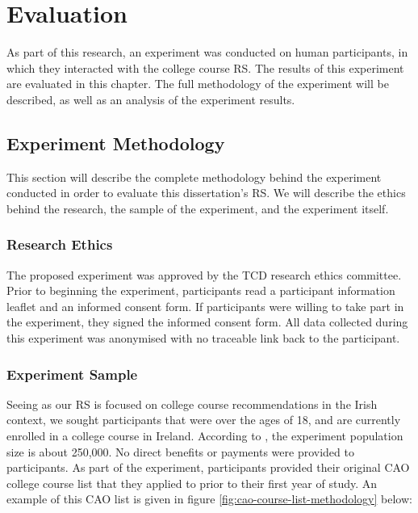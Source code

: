 \chapter{Evaluation}
\label{chap:evaluation}

As part of this research, an experiment was conducted on human participants,
in which they interacted with the college course RS.
The results of this experiment are evaluated in this chapter.
The full methodology of the experiment will be described,
as well as an analysis of the experiment results.

\section{Experiment Methodology}

This section will describe the complete methodology behind the experiment conducted in order to 
evaluate this dissertation's RS.
We will describe the ethics behind the research, the sample of the experiment,
and the experiment itself.

\subsection{Research Ethics}

The proposed experiment was approved by the TCD research ethics committee.
Prior to beginning the experiment, participants read a participant information leaflet
and an informed consent form.
If participants were willing to take part in the experiment, they signed the informed consent form.
All data collected during this experiment was anonymised with no traceable link back to the participant.

\subsection{Experiment Sample}

Seeing as our RS is focused on college course recommendations in the Irish context,
we sought participants that were over the ages of 18, and are currently enrolled in a college course in Ireland.
According to \cite{hea2024key}, the experiment population size is about 250,000.
No direct benefits or payments were provided to participants.
As part of the experiment, participants provided their original CAO college course list
that they applied to prior to their first year of study.
An example of this CAO list is given in figure \ref{fig:cao-course-list-methodology} below:

